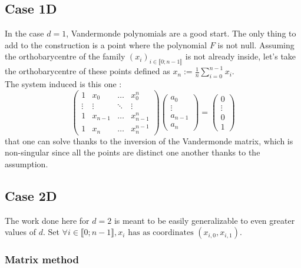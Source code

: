 \documentclass{article}
\theoremstyle{definition}
\theoremstyle{property}
\theoremstyle{remark}
\begin{document}
	\subsection{Case 1D}
	In the case $d=1$, Vandermonde polynomials are a good start. The only thing to add to the construction is a point where the polynomial $F$ is not null. Assuming the orthobarycentre of the family $(x_i)_{i\in \llbracket0;n-1\rrbracket }$ is not already inside, let's take the orthobarycentre of these points defined as $x_n:=\frac{1}{n}\sum_{i=0}^{n-1} x_i$.\\
	The system induced is this one :
	\begin{equation*}
		\begin{pmatrix}
			1 & x_0 & \dots & x_{0}^{n} \\
			\vdots & \vdots & \ddots & \vdots\\
			1 & x_{n-1} & \dots & x_{n-1}^{n} \\
			1 & x_n & \dots & x_n^{n-1} 
		\end{pmatrix}
		\begin{pmatrix}
			a_0\\
			\vdots\\
			a_{n-1}\\
			a_{n}
		\end{pmatrix}
		=
		\begin{pmatrix}
			0\\
			\vdots\\
			0\\
			1
		\end{pmatrix}
	\end{equation*}
	that one can solve thanks to the inversion of the Vandermonde matrix, which is non-singular since all the points are distinct one another thanks to the assumption.
	
	
	\subsection{Case 2D}
	The work done here for $d=2$ is meant to be easily generalizable to even greater values of $d$.
	Set $\forall i \in \llbracket0;n-1\rrbracket, x_i \text{ has as coordinates }(x_{i,0},x_{i,1})$.
	
	\subsubsection{Matrix method}
\end{document}
